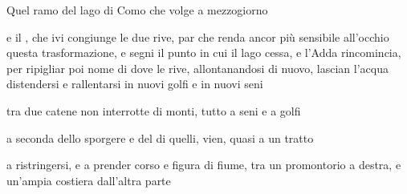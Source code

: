 \documentclass{book}
\begin{document}
\beginnumbering
\numberpstarttrue

\pstart%
Quel ramo del lago di Como che volge a mezzogiorno
\pend

\pstart
e il , che ivi congiunge le due rive, par che renda ancor più sensibile all'occhio questa trasformazione, e segni il punto in cui il lago cessa, e l'Adda rincomincia, per ripigliar poi nome di  dove le rive, allontanandosi di nuovo, lascian l'acqua distendersi e rallentarsi in nuovi golfi e in nuovi seni
\pend

\pstart
tra due catene non interrotte di monti, tutto a seni e a golfi
\pend

\pstart
a seconda dello sporgere e del  di quelli, vien, quasi a un tratto
\pend

\pstart
a ristringersi, e a prender corso e figura di fiume, tra un promontorio a destra, e un'ampia costiera dall'altra parte
\pend

\numberpstartfalse
\endnumbering
\end{document}
